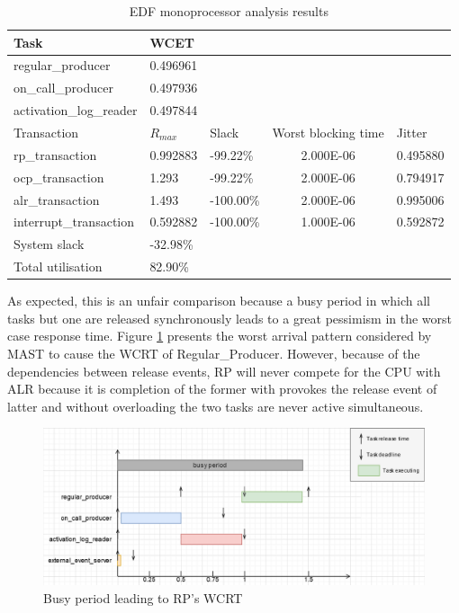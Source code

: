 \documentclass{article}
\begin{document}
\begin{table}[!htbp]
   \centering
   \begin{tabular}{lllcl}
    \toprule
    Task & WCET \\
    \midrule
    regular\_producer & 0.496961 \\
    on\_call\_producer & 0.497936 \\
    activation\_log\_reader & 0.497844 \\
    \toprule
    \toprule
    Transaction & $R_{max}$ & Slack & Worst blocking time & Jitter \\
    \midrule
    rp\_transaction        & 0.992883  & -99.22\%   & 2.000E-06  & 0.495880 \\
    ocp\_transaction       & 1.293     & -99.22\%   & 2.000E-06  & 0.794917 \\
    alr\_transaction       & 1.493     & -100.00\%  & 2.000E-06  & 0.995006 \\
    interrupt\_transaction & 0.592882  & -100.00\%  & 1.000E-06  & 0.592872 \\
    \toprule
    \toprule
    System slack & -32.98\% \\
    Total utilisation & 82.90\% \\
   \end{tabular}
   \caption{EDF monoprocessor analysis results}
   \label{tab:EDF-monoprocessor}
 \end{table}

As expected, this is an unfair comparison because a busy period in which all tasks but one are released synchronously leads to a great pessimism in the worst case response time. Figure \ref{fig:timeline-WCRT-RP} presents the worst arrival pattern considered by MAST to cause the WCRT of Regular\_Producer. However, because of the dependencies between release events, RP will never compete for the CPU with ALR because it is completion of the former with provokes the release event of latter and without overloading the two tasks are never active simultaneous.

\begin{figure}[!htbp]
   \centering
   \includegraphics[width=6in]{images/timelines-WCRT-RP}
   \caption{Busy period leading to RP's WCRT}
   \label{fig:timeline-WCRT-RP}
\end{figure}
\end{document}
